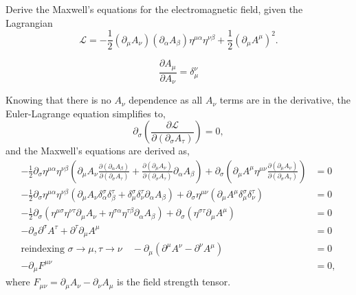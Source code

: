 \begin{Question}
  Derive the Maxwell's equations for the electromagnetic field, given the Lagrangian
  \begin{equation}
    \mathcal{L} = -\frac{1}{2}(\partial_\mu A_\nu)(\partial_\alpha A_\beta)\eta^{\mu\alpha}\eta^{\nu\beta} + \frac{1}{2}(\partial_\mu A^\mu)^2.
  \end{equation}
\end{Question}
\begin{lemma}
  \begin{equation}
    \frac{\partial A_\mu }{\partial A_\nu} = \delta^\nu_\mu 
  \end{equation}
  \vspace{-0.5cm}
\end{lemma}
  
Knowing that there is no $A_\nu$ dependence as all $A_\nu$ terms are in the derivative, the Euler-Lagrange equation simplifies to,
\begin{equation}
  \partial_\sigma \left(\frac{\partial \mathcal{L}}{\partial (\partial_\sigma A_\tau)}\right) = 0,
\end{equation}
and the Maxwell's equations are derived as,
\begin{equation}
  \begin{aligned}
    -\frac{1}{2} \partial_\sigma \eta^{\mu\alpha}\eta^{\nu\beta} \left(\partial_\mu A_\nu \frac{\partial(\partial_\alpha A_\beta)}{\partial (\partial_\sigma A_\tau)} + \frac{\partial(\partial_\mu A_\nu)}{\partial (\partial_\sigma A_\tau)}\partial_\alpha A_\beta\right) + \partial_\sigma\left(\partial_\mu A^\mu \eta^{\mu\nu}\frac{\partial(\partial_\mu A_\nu)}{\partial (\partial_\sigma A_\tau)}\right) &= 0\\
    -\frac{1}{2} \partial_\sigma \eta^{\mu\alpha}\eta^{\nu\beta} \left(\partial_\mu A_\nu \delta^\sigma_\alpha \delta^\tau_\beta + \delta^\sigma_\mu \delta^\tau_\nu \partial_\alpha A_\beta\right) +  \partial_\sigma \eta^{\mu\nu} \left(\partial_\mu A^\mu \delta^\sigma_\mu \delta^\tau_\nu\right) &= 0\\
    -\frac{1}{2} \partial_\sigma \left(\eta^{\mu\sigma}\eta^{\nu\tau}\partial_\mu A_\nu + \eta^{\sigma\alpha}\eta^{\tau\beta}\partial_\alpha A_\beta\right) +  \partial_\sigma \left(\eta^{\sigma\tau}\partial_\mu A^\mu\right) &= 0\\
   -\partial_\sigma \partial^\sigma A^\tau + \partial^\tau \partial_\mu A^\mu &= 0\\
   \text{reindexing }\sigma\rightarrow\mu, \tau\rightarrow\nu \quad -\partial_\mu (\partial^\mu A^\nu - \partial ^\nu A^\mu) &= 0\\
   -\partial_\mu F^{\mu\nu} &= 0,
  \end{aligned}
\end{equation}
where $F_{\mu\nu} = \partial_\mu A_\nu - \partial_\nu A_\mu$ is the \textsf{field strength tensor}.
